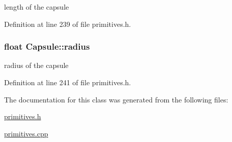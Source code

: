 length of the capsule 



Definition at line 239 of file primitives.\+h.

\subsubsection[{\texorpdfstring{radius}{radius}}]{\setlength{\rightskip}{0pt plus 5cm}float Capsule\+::radius\hspace{0.3cm}{\ttfamily [protected]}}\hypertarget{class_capsule_a9b7e591748a2b735b35d99a2d7792f39}{}\label{class_capsule_a9b7e591748a2b735b35d99a2d7792f39}


radius of the capsule 



Definition at line 241 of file primitives.\+h.



The documentation for this class was generated from the following files\+:\begin{DoxyCompactItemize}
\item 
\hyperlink{primitives_8h}{primitives.\+h}\item 
\hyperlink{primitives_8cpp}{primitives.\+cpp}\end{DoxyCompactItemize}
